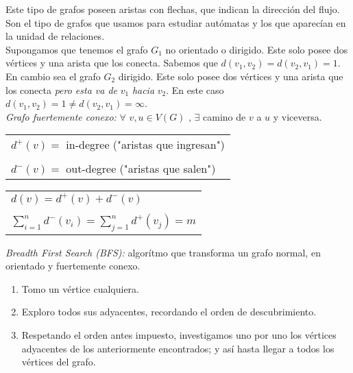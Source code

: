 \documentclass[titlepage,a4paper,12pt,twoside]{article}
\begin{document}
Este tipo de grafos poseen aristas con flechas, que indican la dirección del flujo. Son el tipo de grafos que usamos para estudiar autómatas y los que aparecían en la unidad de relaciones. \\

Supongamos que tenemos el grafo $G_{1}$ no orientado o dirigido. Este solo posee dos vértices y una arista que los conecta. Sabemos que $d(v_{1},v_{2}) = d(v_{2},v_{1}) = 1$.  En cambio sea el grafo $G_{2}$ dirigido. Este solo posee dos vértices y una arista que los conecta \textit{pero esta va de} $v_{1}$ \textit{hacia} $v_{2}$. En este caso $d(v_{1},v_{2}) = 1 \neq d(v_{2},v_{1}) = \infty$.\\

\textit{Grafo fuertemente conexo:} $\forall $ $ v,u \in V(G)$ , $\exists$ camino de $v$ a $u$ y viceversa.\\

\begin{table}[htbp]
\centering
\begin{tabular}{l}
$d^{+}(v) =$ in-degree ("$ $aristas que ingresan")\\
$ $\\
$d^{-}(v) =$ out-degree ("$ $aristas que salen")\\
\end{tabular}
\label{tabla}
\end{table}

\begin{table}[htbp]
\centering
\begin{tabular}{l}
$d(v) = d^{+}(v) + d^{-}(v)$\\
$ $\\
$\displaystyle \sum_{i=1}^{n} d^{-}(v_{i}) = \sum_{j=1}^{n} d^{+}(v_{j}) = m $\\
\end{tabular}
\label{tabla}
\end{table}

\textit{Breadth First Search (BFS):} algorítmo que transforma un grafo normal, en orientado y fuertemente conexo.
\begin{enumerate}
\item Tomo un vértice cualquiera.
\item Exploro todos sus adyacentes, recordando el orden de descubrimiento.
\item Respetando el orden antes impuesto, investigamos uno por uno los vértices adyacentes de los anteriormente encontrados; y así hasta llegar a todos los vértices del grafo.
\end{enumerate}
\end{document}
